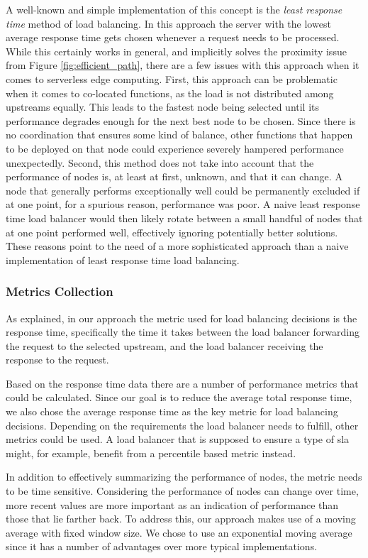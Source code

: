 A well-known and simple implementation of this concept is the \textit{least response time} method of load balancing.
In this approach the server with the lowest average response time gets chosen whenever a request needs to be processed.
While this certainly works in general, and implicitly solves the proximity issue from Figure \ref{fig:efficient_path}, there are a few issues with this approach when it comes to serverless edge computing.
First, this approach can be problematic when it comes to co-located functions, as the load is not distributed among upstreams equally.
This leads to the fastest node being selected until its performance degrades enough for the next best node to be chosen.
Since there is no coordination that ensures some kind of balance, other functions that happen to be deployed on that node could experience severely hampered performance unexpectedly.
Second, this method does not take into account that the performance of nodes is, at least at first, unknown, and that it can change. A node that generally performs exceptionally well could be permanently excluded if at one point, for a spurious reason, performance was poor. A naive least response time load balancer would then likely rotate between a small handful of nodes that at one point performed well, effectively ignoring potentially better solutions.
These reasons point to the need of a more sophisticated approach than a naive implementation of least response time load balancing.

\subsubsection{Metrics Collection}
As explained, in our approach the metric used for load balancing decisions is the response time, specifically the time it takes between the load balancer forwarding the request to the selected upstream, and the load balancer receiving the response to the request.

Based on the response time data there are a number of performance metrics that could be calculated. Since our goal is to reduce the average total response time, we also chose the average response time as the key metric for load balancing decisions.
Depending on the requirements the load balancer needs to fulfill, other metrics could be used. A load balancer that is supposed to ensure a type of \gls{sla} might, for example, benefit from a percentile based metric instead.

In addition to effectively summarizing the performance of nodes, the metric needs to be time sensitive. Considering the performance of nodes can change over time, more recent values are more important as an indication of performance than those that lie farther back.
To address this, our approach makes use of a moving average with fixed window size.
We chose to use an exponential moving average since it has a number of advantages over more typical implementations.

